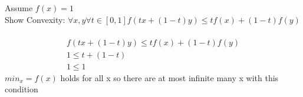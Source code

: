 Assume $f(x) = 1$ \\
Show Convexity:
$\forall x,y \forall t \in [0,1] f(tx+(1-t)y) \le tf(x)+(1-t)f(y)$  \\

 \\
\begin{align*}
f(tx+(1-t)y) \le tf(x)+(1-t)f(y) \\
1 \le t+(1-t) \\
1 \le 1 
\end{align*}
$min_x =f(x)$ holds for all x so there are at most infinite many x with this condition 